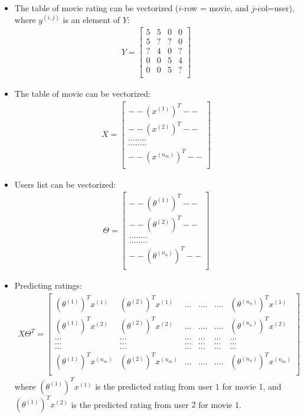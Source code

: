 \documentclass[a4paper,12pt]{report}
\begin{document}
\begin{itemize}
\item The table of movie rating can be vectorized ($i$-row = movie, and $j$-col=user), where $y^{(i,j)}$ is an element of $Y$:
\begin{align}
Y = \left[ \begin{array}{cccc} 
	5 & 5 & 0 & 0 \\
	5 & ? & ? & 0 \\
	? & 4 & 0 & ? \\
	0 & 0 & 5 & 4 \\
	0 & 0 & 5 & ? \\
\end{array}\right]
\end{align}
\item The table of movie can be vectorized:
\begin{align}
X = \left[ \begin{array}{c} 
	-- (x^{(1)})^T -- \\
	--(x^{(2)})^T -- \\
	........ \\
	........ \\
	--(x^{(n_m)})^T -- \\
\end{array}\right]
\end{align}
\item Users list can be vectorized:
\begin{align}
\Theta = \left[ \begin{array}{c} 
	-- (\theta^{(1)})^T -- \\
	--(\theta^{(2)})^T -- \\
	........ \\
	........ \\
	--(\theta^{(n_u)})^T -- \\
\end{array}\right]
\end{align}

\item Predicting ratings:
\begin{align}
X \Theta^T = \left[ \begin{array}{cccccc} 
	(\theta^{(1)})^T x^{(1)} & (\theta^{(2)})^T x^{(1)} & ... & .... & .... & (\theta^{(n_u)})^T x^{(1)}\\
	(\theta^{(1)})^T x^{(2)} & (\theta^{(2)})^T x^{(2)} & ... & .... & .... & (\theta^{(n_u)})^T x^{(2)}\\
	...& ... & ...& ... & ... & ... \\
		...& ... & ...& ... & ... & ... \\
			...& ... & ...& ... & ... & ... \\
	(\theta^{(1)})^T x^{(n_m)} & (\theta^{(2)})^T x^{(n_m)} & ... & .... & .... & (\theta^{(n_u)})^T x^{(n_m)}\\
\end{array}\right]
\end{align}
where $(\theta^{(1)})^T x^{(1)}$ is the predicted rating from user $1$ for movie 1, and $(\theta^{(1)})^T x^{(2)} $ is the predicted rating from user $2$ for movie 1.
\end{itemize}
\end{document}
